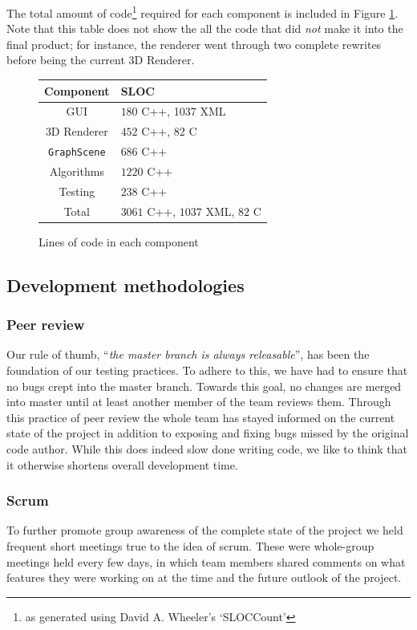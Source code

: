 \documentclass[a4paper,11pt,titlepage]{article}
\newcommand{\code}[1]{\texttt{#1}}
\begin{document}
The total amount of code\footnote{as generated using David
  A. Wheeler's `SLOCCount'} required for each component is included in
Figure \ref{fig:sloc}. Note that this table does not show the all the
code that did \emph{not} make it into the final product; for instance,
the renderer went through two complete rewrites before being the
current 3D Renderer.

\begin{figure}[h]
  \centering
  \begin{tabular}{c|l}
    Component         & SLOC \\
    \hline
    GUI               & $180$ C++, 1037 XML\\
    3D Renderer       & $452$ C++, 82 C\\
    \code{GraphScene} & $686$ C++\\
    Algorithms        & $1220$ C++\\
    Testing           & $238$ C++ \\
    \hline
    Total             & $3061$ C++, $1037$ XML, $82$ C
  \end{tabular}
  \caption{Lines of code in each component}
  \label{fig:sloc}
\end{figure}

\subsection{Development methodologies}

\subsubsection{Peer review}
Our rule of thumb, ``\emph{the master branch is always releasable}'',
has been
the foundation of our testing practices. To adhere to this, we have
had to ensure that no bugs crept into the master branch. Towards this
goal, no changes are merged into master until at least another member
of the team reviews them. Through this practice of peer review the
whole team has stayed informed on the current state of the project
in addition to exposing and fixing bugs missed by the original code
author. While this does indeed slow done writing code, we like to
think that it otherwise shortens overall development time.

\subsubsection{Scrum}
To further promote group awareness of the complete state of the
project we held frequent short meetings true to the idea of scrum.
These were whole-group meetings held every few days, in which team
members shared comments on what features they were working on at
the time and the future outlook of the project.
\end{document}
